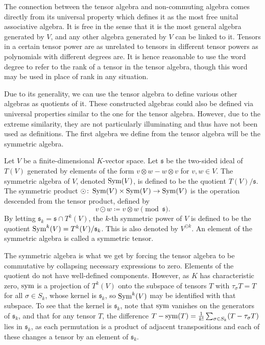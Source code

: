 \documentclass[a4paper,12pt]{article}
\begin{document}
The connection between the tensor algebra and non-commuting algebra comes directly from its universal property which defines it as the most free unital associative algebra.
It is free in the sense that it is the most general algebra generated by $V$, and any other algebra generated by $V$ can be linked to it.
Tensors in a certain tensor power are as unrelated to tensors in different tensor powers as polynomials with different degrees are.
It is hence reasonable to use the word degree to refer to the rank of a tensor in the tensor algebra, though this word may be used in place of rank in any situation.

Due to its generality, we can use the tensor algebra to define various other algebras as quotients of it.
These constructed algebras could also be defined via universal properties similar to the one for the tensor algebra.
However, due to the extreme similarity, they are not particularly illuminating and thus have not been used as definitions.
The first algebra we define from the tensor algebra will be the symmetric algebra.
\begin{definition}\label{def:symmetric_algebra}
    Let $V$ be a finite-dimensional $K$-vector space.
    Let $\mathfrak{s}$ be the two-sided ideal of $T(V)$ generated by elements of the form $v \otimes w - w \otimes v$ for $v, w \in V$.
    The symmetric algebra of $V$, denoted $\operatorname{Sym}(V)$, is defined to be the quotient $T(V) / \mathfrak{s}$.
    The symmetric product $\odot \colon \operatorname{Sym}(V) \times \operatorname{Sym}(V) \to \operatorname{Sym}(V)$ is the operation descended from the tensor product, defined by
    \begin{equation}
        v \odot w \coloneq v \otimes w \pmod{\mathfrak{s}}.
    \end{equation}
    By letting $\mathfrak{s}_k = \mathfrak{s} \cap T^k(V)$, the $k$-th symmetric power of $V$ is defined to be the quotient $\operatorname{Sym}^k(V) = T^k(V) / \mathfrak{s}_k$.
    This is also denoted by $V^{\odot k}$.
    An element of the symmetric algebra is called a symmetric tensor.
\end{definition}
The symmetric algebra is what we get by forcing the tensor algebra to be commutative by collapsing necessary expressions to zero.
Elements of the quotient do not have well-defined components.
However, as $K$ has characteristic zero, $\operatorname{sym}$ is a projection of $T^k(V)$ onto the subspace of tensors $T$ with $\tau_\sigma T = T$ for all $\sigma \in S_k$, whose kernel is $\mathfrak{s}_k$, so $\operatorname{Sym}^k(V)$ may be identified with that subspace.
To see that the kernel is $\mathfrak{s}_k$, note that $\operatorname{sym}$ vanishes on the generators of $\mathfrak{s}_k$, and that for any tensor $T$, the difference $T - \operatorname{sym}(T) = \frac{1}{k!} \sum_{\sigma \in S_k} (T - \tau_\sigma T)$ lies in $\mathfrak{s}_k$, as each permutation is a product of adjacent transpositions and each of these changes a tensor by an element of $\mathfrak{s}_k$.
\end{document}
